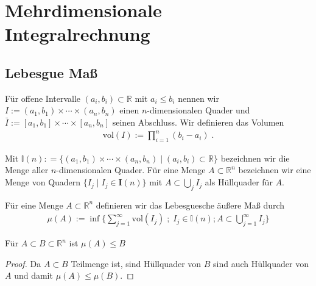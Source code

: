 
\section{Mehrdimensionale Integralrechnung}

\subsection{Lebesgue Maß}

Für offene Intervalle $(a_i,b_i) \subset \mathbb{R}$ mit $a_i \leq b_i$ nennen wir $I := (a_1,b_1) \times \cdots \times (a_n,b_n)$ einen $n$-dimensionalen Quader 
und $\bar{I}:= [a_1, b_1] \times \cdots \times [a_n,b_n]$ seinen Abschluss. Wir definieren das Volumen 
\begin{align*}
\text{vol} (I):=   \prod_{i = 1}^n (b_i -a_i)  \; .
\end{align*}

Mit $\mathbb{I}(n): = \{   (a_1,b_1) \times \cdots \times (a_n,b_n) \; | \;  (a_i, b_i) \subset \mathbb{R} \}$ bezeichnen wir die Menge aller $n$-dimensionalen Quader. 
Für eine Menge $A \subset \mathbb{R}^n$ bezeichnen wir eine Menge von Quadern $\{ I_j \; | \;  I_j \in \mathbf{I}(n)  \}$ mit $A \subset \bigcup_j I_j$ als Hüllquader für $A$.
\begin{Definition}
Für eine Menge $A \subset \mathbb{R}^n$ definieren wir das Lebesguesche äußere Maß durch 
\begin{align*}
\mu (A):=   \inf \biggl \{ \sum_{j=1}^{\infty}   \text{vol} (I_j)\; ; \; I_j \in \mathbb{I}(n); A \subset \bigcup_{j= 1}^{\infty} I_j \biggr \} 
\end{align*}
\end{Definition}

\begin{Definition}
\end{Definition}

\begin{Bemerkung}
\label{massmonton}
Für $A \subset B \subset \mathbb{R}^n$ ist $\mu(A) \leq B$
\end{Bemerkung}
\begin{proof}
Da $A \subset B$ Teilmenge ist, sind Hüllquader von $B$ sind auch Hüllquader von $A$ und damit  $\mu(A) \leq \mu(B)$.
\end{proof}

